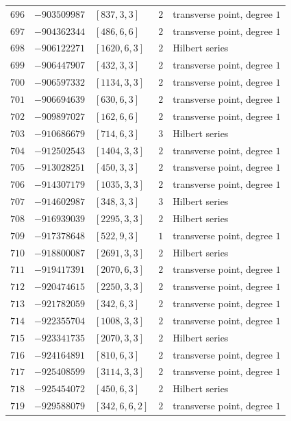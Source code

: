 \documentclass[11pt]{article}
\begin{document}
\begin{center}
\begin{longtable}{r r l c l}
$696$ & $-903509987$ & $[837,3,3]$ & $2$ & transverse point, degree $1$\\
$697$ & $-904362344$ & $[486,6,6]$ & $2$ & transverse point, degree $1$\\
$698$ & $-906122271$ & $[1620,6,3]$ & $2$ & Hilbert series\\
$699$ & $-906447907$ & $[432,3,3]$ & $2$ & transverse point, degree $1$\\
$700$ & $-906597332$ & $[1134,3,3]$ & $2$ & transverse point, degree $1$\\
$701$ & $-906694639$ & $[630,6,3]$ & $2$ & transverse point, degree $1$\\
$702$ & $-909897027$ & $[162,6,6]$ & $2$ & transverse point, degree $1$\\
$703$ & $-910686679$ & $[714,6,3]$ & $3$ & Hilbert series\\
$704$ & $-912502543$ & $[1404,3,3]$ & $2$ & transverse point, degree $1$\\
$705$ & $-913028251$ & $[450,3,3]$ & $2$ & transverse point, degree $1$\\
$706$ & $-914307179$ & $[1035,3,3]$ & $2$ & transverse point, degree $1$\\
$707$ & $-914602987$ & $[348,3,3]$ & $3$ & Hilbert series\\
$708$ & $-916939039$ & $[2295,3,3]$ & $2$ & Hilbert series\\
$709$ & $-917378648$ & $[522,9,3]$ & $1$ & transverse point, degree $1$\\
$710$ & $-918800087$ & $[2691,3,3]$ & $2$ & Hilbert series\\
$711$ & $-919417391$ & $[2070,6,3]$ & $2$ & transverse point, degree $1$\\
$712$ & $-920474615$ & $[2250,3,3]$ & $2$ & transverse point, degree $1$\\
$713$ & $-921782059$ & $[342,6,3]$ & $2$ & transverse point, degree $1$\\
$714$ & $-922355704$ & $[1008,3,3]$ & $2$ & transverse point, degree $1$\\
$715$ & $-923341735$ & $[2070,3,3]$ & $2$ & Hilbert series\\
$716$ & $-924164891$ & $[810,6,3]$ & $2$ & transverse point, degree $1$\\
$717$ & $-925408599$ & $[3114,3,3]$ & $2$ & transverse point, degree $1$\\
$718$ & $-925454072$ & $[450,6,3]$ & $2$ & Hilbert series\\
$719$ & $-929588079$ & $[342,6,6,2]$ & $2$ & transverse point, degree $1$\\

\end{longtable}
\end{center}
\end{document}
